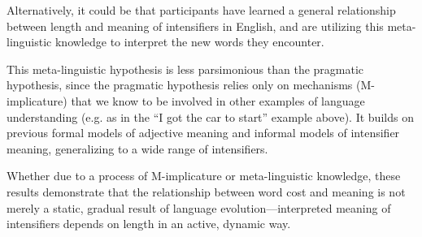 Alternatively, it could be that participants have learned a general relationship between length and meaning of intensifiers in English, and are utilizing this meta-linguistic knowledge to interpret the new words they encounter.

This meta-linguistic hypothesis is less parsimonious than the pragmatic hypothesis, since the pragmatic hypothesis relies only on mechanisms (M-implicature) that we know to be involved in other examples of language understanding (e.g. as in the ``I got the car to start'' example above).
It builds on previous formal models of adjective meaning and informal models of intensifier meaning, generalizing to a wide range of intensifiers.

Whether due to a process of M-implicature or meta-linguistic knowledge, these results demonstrate that the relationship between word cost and meaning is not merely a static, gradual result of language evolution---interpreted meaning of intensifiers depends on length in an active, dynamic way.
